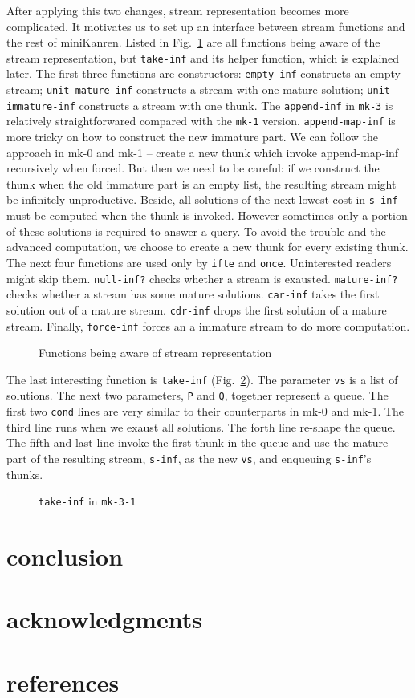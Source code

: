 \documentclass[format=acmlarge, review=true, authordraft=true]{acmart}
\begin{document}
After applying this two changes, stream representation becomes more 
complicated. It motivates us to set up an interface between stream functions 
and the rest of miniKanren. Listed in Fig.~\ref{interface} are all functions 
being aware of the stream representation, but \texttt{take-inf} and its helper 
function, which is explained later. The first three functions are constructors: 
\texttt{empty-inf} constructs an empty stream; \texttt{unit-mature-inf} 
constructs a stream with one mature solution; \texttt{unit-immature-inf} 
constructs a stream with one thunk. The \texttt{append-inf} in \texttt{mk-3} is 
relatively straightforwared compared with the \texttt{mk-1} version. 
\texttt{append-map-inf} is more tricky on how to construct the new immature 
part. We can follow the approach in mk-0 and mk-1 -- create a new thunk which 
invoke append-map-inf recursively when forced. But then we need to be careful: 
if we construct the thunk when the old immature part is an empty list, the 
resulting stream might be infinitely unproductive. Beside, all solutions of the 
next lowest cost in \texttt{s-inf} must be computed when the thunk is invoked. 
However sometimes only a portion of these solutions is required to answer a 
query. To avoid the trouble and the advanced computation, we choose to create a 
new thunk for every existing thunk. The next four functions are used only by 
\texttt{ifte} and \texttt{once}. Uninterested readers might skip them. 
\texttt{null-inf?} checks whether a stream is exausted. \texttt{mature-inf?} 
checks whether a stream has some mature solutions. \texttt{car-inf} takes the 
first solution out of a mature stream. \texttt{cdr-inf} drops the first 
solution of a mature stream. Finally, \texttt{force-inf} forces an a immature 
stream to do more computation.

\begin{figure}
	 	
	 \caption{Functions being aware of stream representation}
	 \label{interface}
\end{figure}


The last interesting function is \texttt{take-inf} (Fig.~\ref{take-inf-3-1}). 
The parameter \texttt{vs} is a list of solutions. The next two parameters, 
\texttt{P} and \texttt{Q}, together represent a queue. The first two 
\texttt{cond} lines are very similar to their counterparts in mk-0 and mk-1. 
The third line runs when we exaust all solutions. The forth line re-shape the 
queue. The fifth and last line invoke the first thunk in the queue and use the 
mature part of the resulting stream, \texttt{s-inf}, as the new \texttt{vs}, 
and enqueuing \texttt{s-inf}'s thunks.

\begin{figure}
	 	
	 \caption{\texttt{take-inf} in \texttt{mk-3-1}}
	 \label{take-inf-3-1}
\end{figure}



\section{conclusion}

\section*{acknowledgments}

\section*{references}
\end{document}
